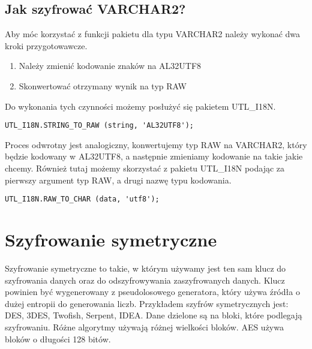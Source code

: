 \documentclass[12pt, a4paper]{article}
\begin{document}
\subsection{Jak szyfrować VARCHAR2?}

Aby móc korzystać z funkcji pakietu dla typu VARCHAR2 należy wykonać
dwa kroki przygotowawcze.
\begin{enumerate}
	\item Należy zmienić kodowanie znaków na AL32UTF8
	\item Skonwertować otrzymany wynik na typ RAW
\end{enumerate}
Do wykonania tych czynności możemy posłużyć się pakietem UTL\_I18N.
\begin{lstlisting}
UTL_I18N.STRING_TO_RAW (string, 'AL32UTF8');
\end{lstlisting}

Proces odwrotny jest analogiczny, konwertujemy typ RAW na VARCHAR2, który
będzie kodowany w AL32UTF8, a następnie zmieniamy kodowanie na takie
jakie chcemy. Również tutaj możemy skorzystać z pakietu UTL\_I18N
podając za pierwszy argument typ RAW, a drugi nazwę typu kodowania.

\begin{lstlisting}
UTL_I18N.RAW_TO_CHAR (data, 'utf8');
\end{lstlisting}

\section{Szyfrowanie symetryczne}
Szyfrowanie symetryczne to takie, w którym używamy jest ten sam klucz do
szyfrowania danych oraz do odszyfrowywania zaszyfrowanych danych. Klucz
powinien być wygenerowany z pseudolosowego generatora, który używa
źródła o dużej entropii do generowania liczb. Przykładem szyfrów
symetrycznych jest: DES, 3DES, Twofish, Serpent, IDEA. Dane dzielone są na
bloki, które podlegają szyfrowaniu. Różne algorytmy używają różnej
wielkości bloków. AES używa bloków o długości 128 bitów.
  
\end{document}
